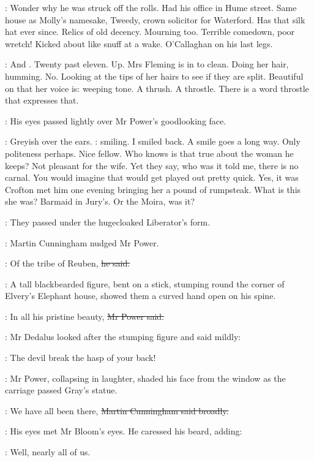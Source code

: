 \BloomInt:
Wonder why he was struck off the rolls.
Had his office in Hume street.
Same house as Molly's namesake,
Tweedy, crown solicitor for Waterford.
Has that silk hat ever since.
Relics of old decency.
Mourning too.
Terrible comedown, poor wretch!
Kicked about like snuff at a wake.
O'Callaghan on his last legs.

\BloomInt:
And .
Twenty past eleven.
Up.
Mrs Fleming is in to clean.
Doing her hair, humming.
No.
Looking at the tips of her hairs to see if they are split.
Beautiful on that  her voice is:
weeping tone.
A thrush.
A throstle.
There is a word throstle that expresses that.

:
His eyes passed lightly over Mr Power's goodlooking face.

\BloomInt:
Greyish over the ears.
:
smiling.
I smiled back.
A smile goes a long way.
Only politeness perhaps.
Nice fellow.
Who knows is that true about the woman he keeps?
Not pleasant for the wife.
Yet they say,
who was it told me,
there is no carnal.
You would imagine that would get played out pretty quick.
Yes, it was Crofton met him one evening
bringing her a pound of rumpsteak.
What is this she was?
Barmaid in Jury's.
Or the Moira, was it?

:
They passed under the hugecloaked Liberator's form.

:
Martin Cunningham nudged Mr Power.

\cunningham:
Of the tribe of Reuben,
\sout{he said.}

:
A tall blackbearded figure, bent on a stick,
stumping round the corner of Elvery's Elephant house,
showed them a curved hand open on his spine.

\power:
In all his pristine beauty,
\sout{Mr Power said.}

:
Mr Dedalus looked after the stumping figure and said mildly:

\simon:
The devil break the hasp of your back!

:
Mr Power, collapsing in laughter,
shaded his face from the window as the carriage passed Gray's statue.

\cunningham:
We have all been there,
\sout{Martin Cunningham said broadly.}

:
His eyes met Mr Bloom's eyes.
He caressed his beard, adding:

\cunningham:
Well, nearly all of us.

